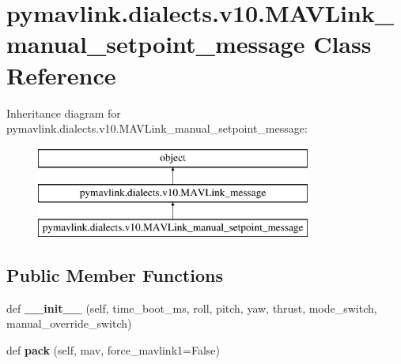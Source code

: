 \hypertarget{classpymavlink_1_1dialects_1_1v10_1_1MAVLink__manual__setpoint__message}{}\section{pymavlink.\+dialects.\+v10.\+M\+A\+V\+Link\+\_\+manual\+\_\+setpoint\+\_\+message Class Reference}
\label{classpymavlink_1_1dialects_1_1v10_1_1MAVLink__manual__setpoint__message}
Inheritance diagram for pymavlink.\+dialects.\+v10.\+M\+A\+V\+Link\+\_\+manual\+\_\+setpoint\+\_\+message\+:\begin{figure}[H]
\begin{center}
\leavevmode
\includegraphics[height=3.000000cm]{classpymavlink_1_1dialects_1_1v10_1_1MAVLink__manual__setpoint__message}
\end{center}
\end{figure}
\subsection*{Public Member Functions}
\begin{DoxyCompactItemize}
\item 
\mbox{\label{classpymavlink_1_1dialects_1_1v10_1_1MAVLink__manual__setpoint__message_a554ec4c2f5aff12786a995a99f6896ac}} 
def {\bfseries \+\_\+\+\_\+init\+\_\+\+\_\+} (self, time\+\_\+boot\+\_\+ms, roll, pitch, yaw, thrust, mode\+\_\+switch, manual\+\_\+override\+\_\+switch)
\item 
\mbox{\label{classpymavlink_1_1dialects_1_1v10_1_1MAVLink__manual__setpoint__message_adf5dce6d86db5eed3dd6fca0d1f9f10f}} 
def {\bfseries pack} (self, mav, force\+\_\+mavlink1=False)
\end{DoxyCompactItemize}
